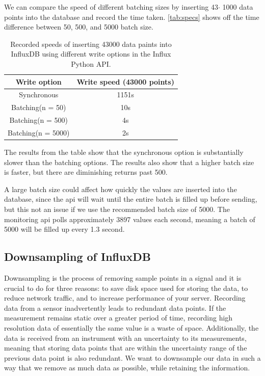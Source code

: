 \documentclass[main.tex]{subfiles}
\begin{document}
We can compare the speed of different batching sizes by inserting 43$\cdot$ 1000 data points into the database and record the time taken. \autoref{tab:specs} shows off the time difference between 50, 500, and 5000 batch size.
\begin{table}[h]
\centering
\begin{tabular}{||c c||} 
 \hline
 Write option & Write speed (43000 points)\\ [0.5ex] 
 \hline\hline
 Synchronous & 1151s \\ 
 \hline
 Batching(n = 50) & 10s  \\
 \hline
 Batching(n = 500) & 4s \\
 \hline
 Batching(n = 5000) & 2s\\ [1ex]
\hline

\end{tabular}
\caption{\label{tab:specs} Recorded speeds of inserting 43000 data paints into InfluxDB using different write options in the Influx Python API.}
\end{table}
\FloatBarrier

The results from the table show that the synchronous option is substantially slower than the batching options. The results also show that a higher batch size is faster, but there are diminishing returns past 500. 

A large batch size could affect how quickly the values are inserted into the database, since the \gls{api} will wait until the entire batch is filled up before sending, but this not an issue if we use the recommended batch size of 5000. The monitoring \gls{api} polls approximately 3897 values each second, meaning a batch of 5000 will be filled up every 1.3 second.

 
 
 \subsection{Downsampling of InfluxDB}
 \label{ssec: downsampling}

 Downsampling is the process of removing sample points in a signal and it is crucial to do for three reasons: to save disk space used for storing the data, to reduce network traffic, and to increase performance of your server. Recording data from a sensor inadvertently leads to redundant data points. If the measurement remains static over a greater period of time, recording high resolution data of essentially the same value is a waste of space. Additionally, the data is received from an instrument with an uncertainty to its measurements, meaning that storing data points that are within the uncertainty range of the previous data point is also redundant. We want to downsample our data in such a way that we remove as much data as possible, while retaining the information.
 
\end{document}
